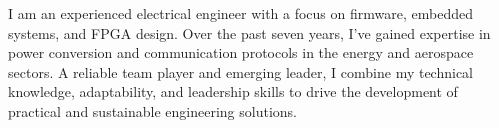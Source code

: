 \documentclass[8pt]{developercv} %
\begin{document}
\vspace{0.5cm}



\begin{minipage}[t]{0.4\textwidth} %
	\vspace{-\baselineskip} %
	
I am an experienced electrical engineer with a focus on firmware, embedded systems, and FPGA design. Over the past seven years, I've gained expertise in power conversion and communication protocols in the energy and aerospace sectors. A reliable team player and emerging leader, I combine my technical knowledge, adaptability, and leadership skills to drive the development of practical and sustainable engineering solutions.

\end{minipage}
\hfill %
\begin{minipage}[t]{0.5\textwidth} %
	\vspace{-\baselineskip} %
	\begin{barchart}{5.5}
	\end{barchart}
\end{minipage}



\end{document}
